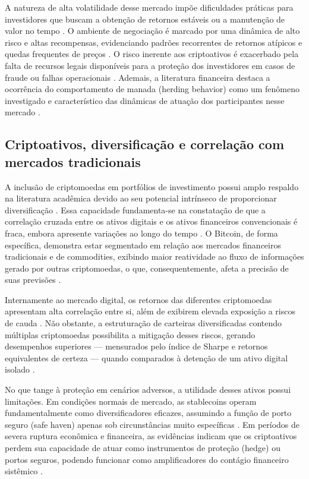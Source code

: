 A natureza de alta volatilidade desse mercado impõe dificuldades práticas para investidores que buscam a obtenção de retornos estáveis ou a manutenção de valor no tempo \cite{wang2020stablecoins}. O ambiente de negociação é marcado por uma dinâmica de alto risco e altas recompensas, evidenciando padrões recorrentes de retornos atípicos e quedas frequentes de preços \cite{park2023intelligent}. O risco inerente aos criptoativos é exacerbado pela falta de recursos legais disponíveis para a proteção dos investidores em casos de fraude ou falhas operacionais \cite{charfeddine2020investigating}. Ademais, a literatura financeira destaca a ocorrência do comportamento de manada (herding behavior) como um fenômeno investigado e característico das dinâmicas de atuação dos participantes nesse mercado \cite{ballis2020herding}.

\subsection{Criptoativos, diversificação e correlação com mercados tradicionais}
\label{subsec_criptoativos_diversificacao_e_correlacao_com_mercados_tradicionais}

A inclusão de criptomoedas em portfólios de investimento possui amplo respaldo na literatura acadêmica devido ao seu potencial intrínseco de proporcionar diversificação \cite{charfeddine2020investigating}. Essa capacidade fundamenta-se na constatação de que a correlação cruzada entre os ativos digitais e os ativos financeiros convencionais é fraca, embora apresente variações ao longo do tempo \cite{charfeddine2020investigating}. O Bitcoin, de forma específica, demonstra estar segmentado em relação aos mercados financeiros tradicionais e de commodities, exibindo maior reatividade ao fluxo de informações gerado por outras criptomoedas, o que, consequentemente, afeta a precisão de suas previsões \cite{chevallier2021forecast}.

Internamente ao mercado digital, os retornos das diferentes criptomoedas apresentam alta correlação entre si, além de exibirem elevada exposição a riscos de cauda \cite{fakhfekh2020volatility}. Não obstante, a estruturação de carteiras diversificadas contendo múltiplas criptomoedas possibilita a mitigação desses riscos, gerando desempenhos superiores --- mensurados pelo índice de Sharpe e retornos equivalentes de certeza --- quando comparados à detenção de um ativo digital isolado \cite{brauneis2019cryptocurrency}.

No que tange à proteção em cenários adversos, a utilidade desses ativos possui limitações. Em condições normais de mercado, as stablecoins operam fundamentalmente como diversificadores eficazes, assumindo a função de porto seguro (safe haven) apenas sob circunstâncias muito específicas \cite{wang2020stablecoins}. Em períodos de severa ruptura econômica e financeira, as evidências indicam que os criptoativos perdem sua capacidade de atuar como instrumentos de proteção (hedge) ou portos seguros, podendo funcionar como amplificadores do contágio financeiro sistêmico \cite{corbet2020contagion}.

